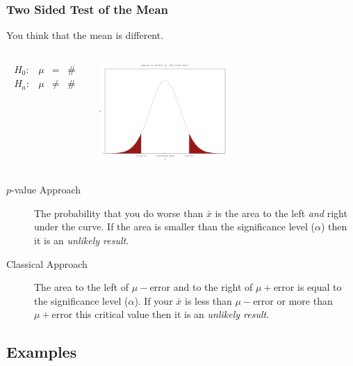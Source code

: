 \begin{frame}
  \frametitle{Two Sided Test of the Mean}

  \vspace*{-1em}

  You think that the mean is different.

  \begin{columns}
    \begin{eqnarray*}
      \begin{array}{lrcl}
        H_0: & \mu & = & \# \\
        H_a: & \mu & \neq & \#
      \end{array}
    \end{eqnarray*}


    \includegraphics[width=5cm]{img/twoSideHypothesisTest}

  \end{columns}

  \begin{description}
  \item[$p$-value Approach] The probability that you do worse than
    $\bar{x}$ is the area to the left \textit{and} right under the
    curve. If the area is smaller than the significance level
    ($\alpha$) then it is an \textit{unlikely result}.
  \item[Classical Approach] The area to the left of
    $\mu-\mathrm{error}$ and to the right of $\mu+\mathrm{error}$ is
    equal to the significance level ($\alpha$). If your $\bar{x}$ is
    less than $\mu-\mathrm{error}$ or more than $\mu+\mathrm{error}$
    this critical value then it is an \textit{unlikely result}.
  \end{description}


\end{frame}



\subsection{Examples}

